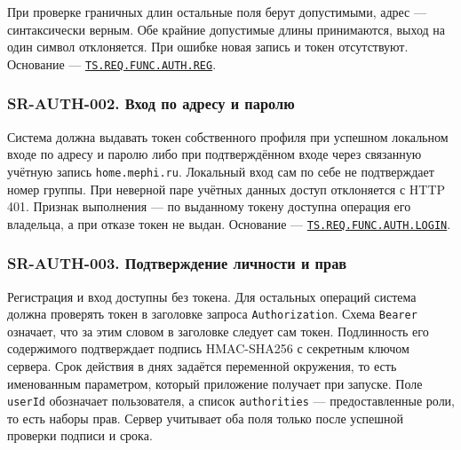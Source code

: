 \documentclass[12pt,a4paper]{article}
\begin{document}
При проверке граничных длин остальные поля берут допустимыми, адрес --- синтаксически верным. Обе крайние допустимые длины принимаются, выход на один символ отклоняется. При ошибке новая запись и токен отсутствуют. Основание --- {\href{../02\_Техническое\_задание/Техническое\_задание.pdf\#ts-req-func-auth-reg}{\texttt{TS.\allowbreak{}REQ.\allowbreak{}FUNC.\allowbreak{}AUTH.\allowbreak{}REG}}}.

\subsubsection{SR-AUTH-002. Вход по адресу и паролю}\label{sr-auth-002-ux432ux445ux43eux434-ux43fux43e-ux430ux434ux440ux435ux441ux443-ux438-ux43fux430ux440ux43eux43bux44e}

\hypertarget{sr-auth-002-вход-по-адресу-и-паролю}{}

\hypertarget{sr-auth-002}{}

Система должна выдавать токен собственного профиля при успешном локальном входе по адресу и паролю либо при подтверждённом входе через связанную учётную запись \texttt{home.\allowbreak{}mephi.\allowbreak{}ru}. Локальный вход сам по себе не подтверждает номер группы. При неверной паре учётных данных доступ отклоняется с HTTP 401. Признак выполнения --- по выданному токену доступна операция его владельца, а при отказе токен не выдан. Основание --- {\href{../02\_Техническое\_задание/Техническое\_задание.pdf\#ts-req-func-auth-login}{\texttt{TS.\allowbreak{}REQ.\allowbreak{}FUNC.\allowbreak{}AUTH.\allowbreak{}LOGIN}}}.

\subsubsection{SR-AUTH-003. Подтверждение личности и прав}\label{sr-auth-003-ux43fux43eux434ux442ux432ux435ux440ux436ux434ux435ux43dux438ux435-ux43bux438ux447ux43dux43eux441ux442ux438-ux438-ux43fux440ux430ux432}

\hypertarget{sr-auth-003-подтверждение-личности-и-прав}{}

\hypertarget{sr-auth-003}{}

Регистрация и вход доступны без токена. Для остальных операций система должна проверять токен в заголовке запроса \texttt{Authorization}. Схема \texttt{Bearer} означает, что за этим словом в заголовке следует сам токен. Подлинность его содержимого подтверждает подпись HMAC-SHA256 с секретным ключом сервера. Срок действия в днях задаётся переменной окружения, то есть именованным параметром, который приложение получает при запуске. Поле \texttt{userId} обозначает пользователя, а список \texttt{authorities} --- предоставленные роли, то есть наборы прав. Сервер учитывает оба поля только после успешной проверки подписи и срока.
\end{document}
